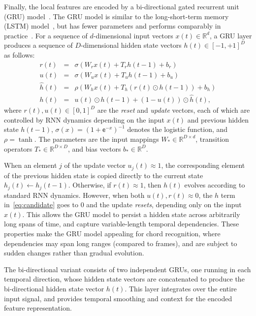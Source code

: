 \documentclass{article}
\begin{document}
Finally, the local features are encoded by a bi-directional gated recurrent unit (GRU) model~\cite{cho2014learning}.
The GRU model is similar to the long-short-term memory (LSTM) model~\cite{hochreiter1997long}, but has fewer parameters and performs comparably in practice~\cite{jozefowicz2015empirical}.
For a sequence of $d$-dimensional input vectors $x(t) \in \mathbb{R}^d$, a GRU layer produces a sequence of $D$-dimensional hidden state vectors $h(t) \in {[-1, +1]}^D$ as follows:
\begin{eqnarray}
    r(t) &=& \sigma\left(W_r x(t) + T_r h(t-1) + b_r\right)\\
    u(t) &=& \sigma\left(W_u x(t) + T_u h(t-1) + b_u\right)\\
    \hat{h}(t) &=& \rho\left(W_h x(t) + T_h \left( r(t) \odot h(t-1) \right) + b_h \right)\label{eq:candidate}\\
    h(t) &=& u(t) \odot h(t-1) + (1-u(t)) \odot \hat{h}(t),
\end{eqnarray}
where $r(t), u(t) \in {[0,1]}^D$ are the \emph{reset} and \emph{update} vectors, each of which are controlled by RNN dynamics depending on the input $x(t)$ and previous hidden state $h(t-1)$, ${\sigma(x)={(1+\mathsf{e}^{-x})}^{-1}}$ denotes the logistic function, and $\rho = \tanh$.
The parameters are the input mappings $W_* \in \mathbb{R}^{D\times d}$, transition operators $T_* \in \mathbb{R}^{D\times D}$, and bias vectors $b_* \in \mathbb{R}^D$.

When an element $j$ of the update vector ${u_j(t)} \approx 1$, the corresponding element of the previous hidden state is copied directly to the current state ${h_j(t)} \leftarrow {h_j(t-1)}$.
Otherwise, if $r(t) \approx 1$, then $h(t)$ evolves according to standard RNN dynamics.
However, when both $u(t), r(t) \approx 0$, the $h$ term in~\eqref{eq:candidate} goes to 0 and the update \emph{resets}, depending only on the input $x(t)$.
This allows the GRU model to persist a hidden state across arbitrarily long spans of time, and capture variable-length temporal dependencies.
These properties make the GRU model appealing for chord recognition, where dependencies may span long ranges (compared to frames), and are subject to sudden changes rather than gradual evolution.

The bi-directional variant consists of two independent GRUs, one running in each temporal direction, whose hidden state vectors are concatenated to produce the bi-directional hidden state vector $h(t)$.
This layer integrates over the entire input signal, and provides temporal smoothing and context for the encoded feature representation.
\end{document}

